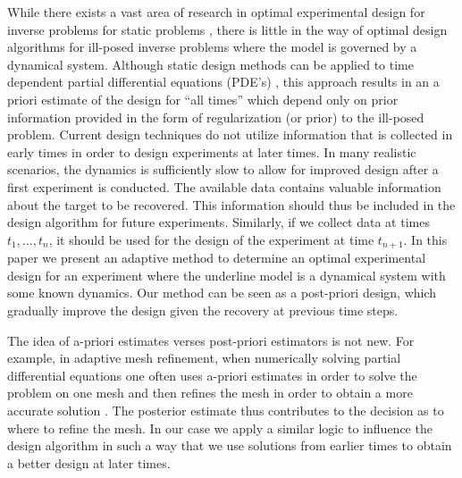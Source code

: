 \documentclass[11pt]{article}
\begin{document}
While there exists a vast area of research in optimal experimental design for  inverse problems  for static problems \cite{HaberMagnantLuceroTenorio12,HaberHoreshTenorio08,HaberHoreshTenorio09,bardow2008,ChalonerVerdinelli1995,Curtis1999,AtkinsonDonev1992,Pukelsheim93,Ajo-Franklin2009}, there is little in the way of optimal design algorithms for ill-posed inverse problems where the model is governed by a dynamical system. Although static design methods can be applied to time dependent partial differential equations (PDE's) \cite{Alexanderian2014,ChungHaber12}, this approach results in an a priori estimate of the design for ``all times''  which depend only on prior information provided in the form of regularization (or prior) to the ill-posed problem.  Current design techniques do not utilize information that is collected in early times in order
 to design experiments at later times.
 In many realistic scenarios, the dynamics is sufficiently slow to allow for improved design after a first experiment is conducted. The available data contains valuable information about the target to be recovered. This information should thus be included in the design algorithm for future experiments. 
 Similarly, if we  collect data at times $t_{1},\ldots , t_{n}$, it should be used for the design of the experiment at time $t_{n+1}$.
 In this paper we present an adaptive method to determine an optimal experimental design for an experiment where the underline model is a dynamical system with some known dynamics.
 Our method can be seen as a post-priori design, which gradually improve the design given the recovery at previous time steps. 
  
 The idea of a-priori estimates verses post-priori  estimators is not new. For example, in adaptive mesh refinement, when numerically 
solving partial differential
equations one often uses a-priori estimates in order to solve the problem on one mesh 
and then refines the mesh in order to obtain a more accurate solution \cite{MultiGrid}. The posterior estimate thus contributes to the decision as to where to refine the mesh. In our case we apply a similar logic to influence the design algorithm in such a way that we use solutions from earlier times to obtain a better design at later times. 

\bigskip 
\end{document}
